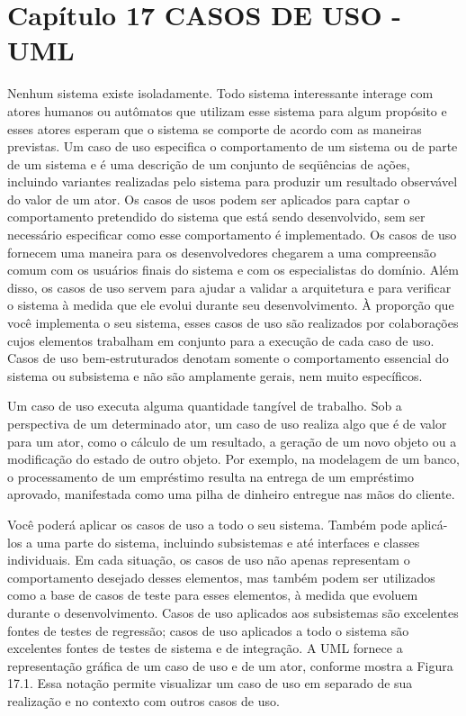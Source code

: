 \documentclass[12pt,a4paper]{article}
\begin{document}
\section{Capítulo 17
CASOS DE USO - UML}
Nenhum sistema existe isoladamente. Todo sistema interessante interage
com atores humanos ou autômatos que utilizam esse sistema para algum propósito e esses atores esperam que o sistema se comporte de acordo com as maneiras previstas. Um caso de uso especifica o comportamento de um sistema ou de
parte de um sistema e é uma descrição de um conjunto de seqüências de ações,
incluindo variantes realizadas pelo sistema para produzir um resultado observável do valor de um ator.
Os casos de usos podem ser aplicados para captar o comportamento pretendido do sistema que está sendo desenvolvido, sem ser necessário especificar
como esse comportamento é implementado. Os casos de uso fornecem uma maneira para os desenvolvedores chegarem a uma compreensão comum com os
usuários finais do sistema e com os especialistas do domínio. Além disso, os casos de uso servem para ajudar a validar a arquitetura e para verificar o sistema à
medida que ele evolui durante seu desenvolvimento. À proporção que você implementa o seu sistema, esses casos de uso são realizados por colaborações cujos
elementos trabalham em conjunto para a execução de cada caso de uso.
Casos de uso bem-estruturados denotam somente o comportamento essencial do sistema ou subsistema e não são amplamente gerais, nem muito específicos.

Um caso de uso executa alguma quantidade tangível de trabalho. Sob a
perspectiva de um determinado ator, um caso de uso realiza algo que é de valor
para um ator, como o cálculo de um resultado, a geração de um novo objeto ou
a modificação do estado de outro objeto. Por exemplo, na modelagem de um
banco, o processamento de um empréstimo resulta na entrega de um empréstimo aprovado, manifestada como uma pilha de dinheiro entregue nas mãos do
cliente.

Você poderá aplicar os casos de uso a todo o seu sistema. Também pode
aplicá-los a uma parte do sistema, incluindo subsistemas e até interfaces e classes
individuais. Em cada situação, os casos de uso não apenas representam o comportamento desejado desses elementos, mas também podem ser utilizados como
a base de casos de teste para esses elementos, à medida que evoluem durante o
desenvolvimento. Casos de uso aplicados aos subsistemas são excelentes fontes
de testes de regressão; casos de uso aplicados a todo o sistema são excelentes
fontes de testes de sistema e de integração. A UML fornece a representação gráfica de um caso de uso e de um ator, conforme mostra a Figura 17.1. Essa notação permite visualizar um caso de uso em separado de sua realização e no contexto com outros casos de uso.


\printbibliography
\end{document}
